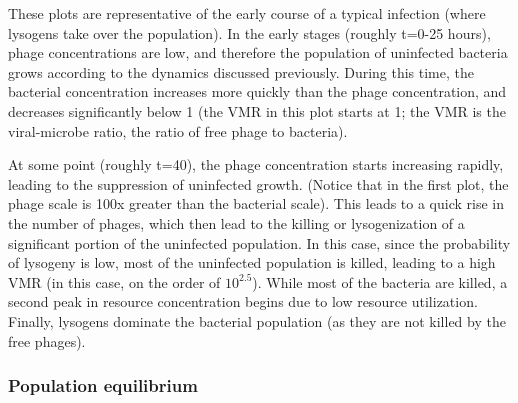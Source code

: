 \documentclass{article}
\begin{document}
These plots are representative of the early course of a typical infection (where lysogens take over the population). In the early stages (roughly t=0-25 hours), phage concentrations are low, and therefore the population of uninfected bacteria grows according to the dynamics discussed previously. During this time, the bacterial concentration increases more quickly than the phage concentration, and decreases significantly below 1 (the VMR in this plot starts at 1; the VMR is the viral-microbe ratio, the ratio of free phage to bacteria). 

At some point (roughly t=40), the phage concentration starts increasing rapidly, leading to the suppression of uninfected growth. (Notice that in the first plot, the phage scale is 100x greater than the bacterial scale). This leads to a quick rise in the number of phages, which then lead to the killing or lysogenization of a significant portion of the uninfected population. In this case, since the probability of lysogeny is low, most of the uninfected population is killed, leading to a high VMR (in this case, on the order of $10^{2.5}$). While most of the bacteria are killed, a second peak in resource concentration begins due to low resource utilization. Finally, lysogens dominate the bacterial population (as they are not killed by the free phages). 

\subsubsection{Population equilibrium}
\end{document}

